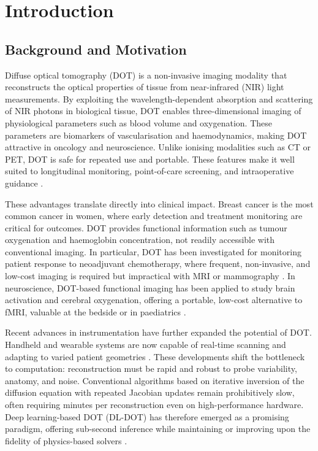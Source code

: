 \chapter{Introduction}

\section{Background and Motivation}
Diffuse optical tomography (DOT) is a non-invasive imaging modality that reconstructs the optical properties of tissue from near-infrared (NIR) light measurements. By exploiting the wavelength-dependent absorption and scattering of NIR photons in biological tissue, DOT enables three-dimensional imaging of physiological parameters such as blood volume and oxygenation. These parameters are biomarkers of vascularisation and haemodynamics, making DOT attractive in oncology and neuroscience. Unlike ionising modalities such as CT or PET, DOT is safe for repeated use and portable. These features make it well suited to longitudinal monitoring, point-of-care screening, and intraoperative guidance \cite{arridge1999, gibson2005}.

These advantages translate directly into clinical impact. Breast cancer is the most common cancer in women, where early detection and treatment monitoring are critical for outcomes. DOT provides functional information such as tumour oxygenation and haemoglobin concentration, not readily accessible with conventional imaging. In particular, DOT has been investigated for monitoring patient response to neoadjuvant chemotherapy, where frequent, non-invasive, and low-cost imaging is required but impractical with MRI or mammography \cite{tromberg2016}. In neuroscience, DOT-based functional imaging has been applied to study brain activation and cerebral oxygenation, offering a portable, low-cost alternative to fMRI, valuable at the bedside or in paediatrics \cite{eggebrecht2014}.

Recent advances in instrumentation have further expanded the potential of DOT. Handheld and wearable systems are now capable of real-time scanning and adapting to varied patient geometries \cite{stillwell2022}. These developments shift the bottleneck to computation: reconstruction must be rapid and robust to probe variability, anatomy, and noise. Conventional algorithms based on iterative inversion of the diffusion equation with repeated Jacobian updates remain prohibitively slow, often requiring minutes per reconstruction even on high-performance hardware. Deep learning-based DOT (DL-DOT) has therefore emerged as a promising paradigm, offering sub-second inference while maintaining or improving upon the fidelity of physics-based solvers \cite{dale2024}.

